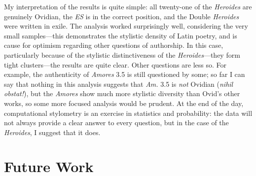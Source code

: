 \documentclass[twocolumn, switch, a4paper]{article} %
\begin{document}
 My interpretation of the results is quite simple: all twenty-one of the
 \emph{Heroides} are genuinely Ovidian, the \emph{ES} is in the correct
 position, and the Double \emph{Heroides} were written in exile. The analysis
 worked surprisingly well, considering the very small samples---this
 demonstrates the stylistic density of Latin poetry, and is cause for optimism
 regarding other questions of authorship. In this case, particularly because
 of the stylistic distinctiveness of the \emph{Heroides}---they form tight
 clusters---the results are quite clear. Other questions are less so. For
 example, the authenticity of \emph{Amores} 3.5 is still questioned by some; so
 far I can say that nothing in this analysis suggests that \emph{Am.} 3.5 is
 \emph{not} Ovidian (\emph{nihil obstat!}), but the \emph{Amores} show much
 more stylistic diversity than Ovid's other works, so some more focused
 analysis would be prudent. At the end of the day, computational stylometry is
 an exercise in statistics and probability: the data will not always provide a
 clear answer to every question, but in the case of the \emph{Heroides}, I
 suggest that it does.

\section{Future Work}
\end{document}
